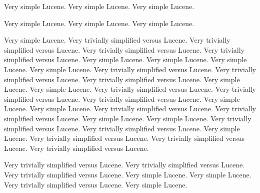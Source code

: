\documentclass[11pt]{book}
\begin{document}
Very simple Lucene.
Very simple Lucene.
Very simple Lucene.

%

Very simple Lucene.
Very simple Lucene.
Very simple Lucene.

Very simple Lucene.
Very trivially simplified versus  Lucene.
Very trivially simplified versus  Lucene.
Very trivially simplified versus  Lucene.
Very trivially simplified versus  Lucene.
Very simple Lucene.
Very simple Lucene.
Very simple Lucene.
Very simple Lucene.
Very trivially simplified versus  Lucene.
Very trivially simplified versus  Lucene.
Very trivially simplified versus  Lucene.
Very simple Lucene.
Very simple Lucene.
Very trivially simplified versus  Lucene.
Very trivially simplified versus  Lucene.
Very trivially simplified versus  Lucene.
Very simple Lucene.
Very simple Lucene.
Very trivially simplified versus  Lucene.
Very trivially simplified versus  Lucene.
Very simple Lucene.
Very simple Lucene.
Very trivially simplified versus  Lucene.
Very trivially simplified versus  Lucene.
Very simple Lucene.
Very trivially simplified versus  Lucene.
Very trivially simplified versus  Lucene.
Very trivially simplified versus  Lucene.

%

Very trivially simplified versus  Lucene.
Very trivially simplified versus  Lucene.
Very trivially simplified versus  Lucene.
Very simple Lucene.
Very simple Lucene.
Very trivially simplified versus  Lucene.
Very simple Lucene.
\end{document}
